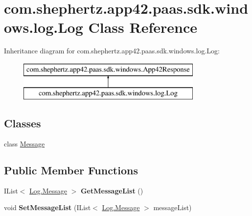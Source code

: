 \hypertarget{classcom_1_1shephertz_1_1app42_1_1paas_1_1sdk_1_1windows_1_1log_1_1_log}{\section{com.\+shephertz.\+app42.\+paas.\+sdk.\+windows.\+log.\+Log Class Reference}
\label{classcom_1_1shephertz_1_1app42_1_1paas_1_1sdk_1_1windows_1_1log_1_1_log}
}
Inheritance diagram for com.\+shephertz.\+app42.\+paas.\+sdk.\+windows.\+log.\+Log\+:\begin{figure}[H]
\begin{center}
\leavevmode
\includegraphics[height=2.000000cm]{classcom_1_1shephertz_1_1app42_1_1paas_1_1sdk_1_1windows_1_1log_1_1_log}
\end{center}
\end{figure}
\subsection*{Classes}
\begin{DoxyCompactItemize}
\item 
class \hyperlink{classcom_1_1shephertz_1_1app42_1_1paas_1_1sdk_1_1windows_1_1log_1_1_log_1_1_message}{Message}
\end{DoxyCompactItemize}
\subsection*{Public Member Functions}
\begin{DoxyCompactItemize}
\item 
\hypertarget{classcom_1_1shephertz_1_1app42_1_1paas_1_1sdk_1_1windows_1_1log_1_1_log_a626159e40fa813b5f94a7e529b7d7d8e}{I\+List$<$ \hyperlink{classcom_1_1shephertz_1_1app42_1_1paas_1_1sdk_1_1windows_1_1log_1_1_log_1_1_message}{Log.\+Message} $>$ {\bfseries Get\+Message\+List} ()}\label{classcom_1_1shephertz_1_1app42_1_1paas_1_1sdk_1_1windows_1_1log_1_1_log_a626159e40fa813b5f94a7e529b7d7d8e}

\item 
\hypertarget{classcom_1_1shephertz_1_1app42_1_1paas_1_1sdk_1_1windows_1_1log_1_1_log_ace8b20e4317673e130e14a117f9e70d8}{void {\bfseries Set\+Message\+List} (I\+List$<$ \hyperlink{classcom_1_1shephertz_1_1app42_1_1paas_1_1sdk_1_1windows_1_1log_1_1_log_1_1_message}{Log.\+Message} $>$ message\+List)}\label{classcom_1_1shephertz_1_1app42_1_1paas_1_1sdk_1_1windows_1_1log_1_1_log_ace8b20e4317673e130e14a117f9e70d8}

\end{DoxyCompactItemize}
